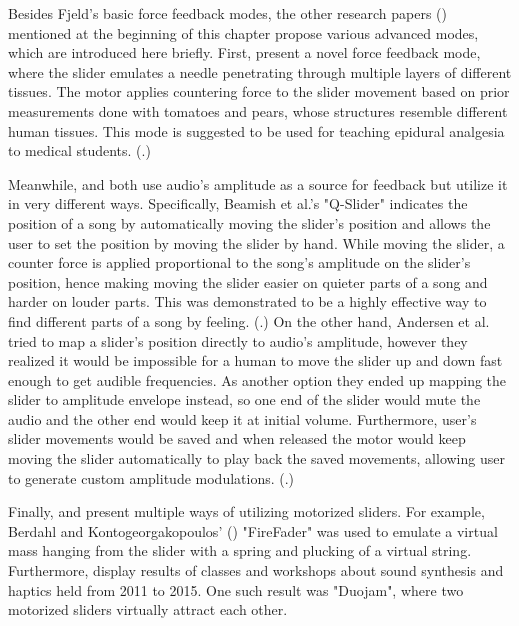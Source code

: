 Besides Fjeld's basic force feedback modes, the other research papers (\cite{andersen2008, bak2015, beamish2004, berdahl-kontogeorgakopoulos2013, gillespie-rosenberg2005}) mentioned at the beginning of this chapter propose various advanced modes, which are introduced here briefly. First, \textcite{gillespie-rosenberg2005} present a novel force feedback mode, where the slider emulates a needle penetrating through multiple layers of different tissues. The motor applies countering force to the slider movement based on prior measurements done with tomatoes and pears, whose structures resemble different human tissues. This mode is suggested to be used for teaching epidural analgesia to medical students. (\cite{gillespie-rosenberg2005}.)

Meanwhile, \textcite{beamish2004} and \textcite{andersen2008} both use audio's amplitude as a source for feedback but utilize it in very different ways. Specifically, Beamish et al.'s "Q-Slider" indicates the position of a song by automatically moving the slider's position and allows the user to set the position by moving the slider by hand. While moving the slider, a counter force is applied proportional to the song's amplitude on the slider's position, hence making moving the slider easier on quieter parts of a song and harder on louder parts. This was demonstrated to be a highly effective way to find different parts of a song by feeling. (\cite{beamish2004}.) On the other hand, Andersen et al. tried to map a slider's position directly to audio's amplitude, however they realized it would be impossible for a human to move the slider up and down fast enough to get audible frequencies. As another option they ended up mapping the slider to amplitude envelope instead, so one end of the slider would mute the audio and the other end would keep it at initial volume. Furthermore, user's slider movements would be saved and when released the motor would keep moving the slider automatically to play back the saved movements, allowing user to generate custom amplitude modulations. (\cite{andersen2008}.)

Finally, \textcite{berdahl-kontogeorgakopoulos2013} and \textcite{bak2015} present multiple ways of utilizing motorized sliders. For example, Berdahl and Kontogeorgakopoulos' (\citeyear{berdahl-kontogeorgakopoulos2013}) "FireFader" was used to emulate a virtual mass hanging from the slider with a spring and plucking of a virtual string. Furthermore, \textcite{bak2015} display results of classes and workshops about sound synthesis and haptics held from 2011 to 2015. One such result was "Duojam", where two motorized sliders virtually attract each other.

